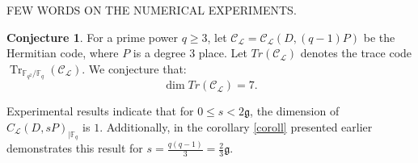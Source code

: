\documentclass[a4paper]{amsart}
\theoremstyle{plain}
\theoremstyle{definition}
\newtheorem{conjecture}{Conjecture}[section]
\theoremstyle{remark}
\newcommand{\g}{\mathfrak{g}}
\DeclareMathOperator{\trace}{Tr}
\newcommand{\calC}{\mathcal{C}}
\begin{document}
FEW WORDS ON THE NUMERICAL EXPERIMENTS.




\begin{conjecture} 
	For a prime power $q \geq 3$, let  $\calC_{\mathcal{L}}=\calC_{\mathcal{L}}( D, (q-1)P)$ be the Hermitian code, where $P$ is a degree 3 place. Let $Tr(\calC_{\mathcal{L}})$ denotes the trace code $\trace_{\mathbb{F}_{q^2} / \mathbb{F}_q}(\calC_{\mathcal{L}})$. We conjecture that:
	\[\dim Tr(\calC_{\mathcal{L}}) = 7 .\]
\end{conjecture}


Experimental results indicate that for $0 \leq s < 2\mathfrak{g}$, the dimension of $C_{\mathcal{L}}(D,sP)_{\mid \mathbb{F}_q}$ is $1$. Additionally, in the corollary \ref{coroll} presented earlier demonstrates this result for $ s =\frac{q(q-1)}{3}=\frac{2}{3} \g$.
\end{document}
